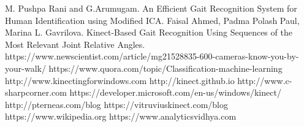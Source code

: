 \begin{thebibliography}{15}
 M. Pushpa Rani and G.Arumugam. An Efficient Gait Recognition System for Human Identification using Modified ICA.
 Faisal Ahmed, Padma Polash Paul, Marina L. Gavrilova. Kinect-Based Gait Recognition Using Sequences of the Most Relevant Joint Relative Angles.
 https://www.newscientist.com/article/mg21528835-600-cameras-know-you-by-your-walk/
 https://www.quora.com/topic/Classification-machine-learning
 http://www.kinectingforwindows.com
 http://kinect.github.io
 http://www.c-sharpcorner.com
 https://developer.microsoft.com/en-us/windows/kinect/
 http://pterneas.com/blog
 https://vitruviuskinect.com/blog
 https://www.wikipedia.org
 https://www.analyticsvidhya.com



\end{thebibliography}